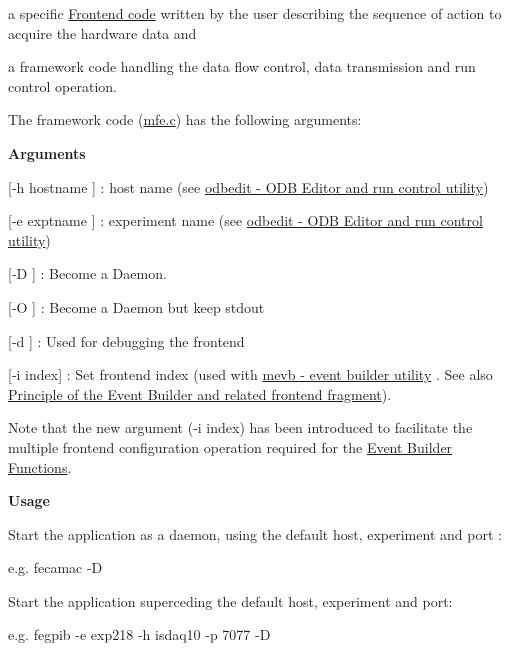 \begin{DoxyEnumerate}
\item a specific \hyperlink{Frontend_code}{Frontend code} written by the user describing the sequence of action to acquire the hardware data and
\item a framework code handling the data flow control, data transmission and run control operation.
\end{DoxyEnumerate}

The framework code (\hyperlink{mfe_8c}{mfe.c}) has the following arguments:
\begin{DoxyItemize}
\item {\bfseries  Arguments }
\begin{DoxyItemize}
\item \mbox{[}-\/h hostname \mbox{]} : host name (see \hyperlink{RC_odbedit_utility}{odbedit -\/ ODB Editor and run control utility})
\item \mbox{[}-\/e exptname \mbox{]} : experiment name (see \hyperlink{RC_odbedit_utility}{odbedit -\/ ODB Editor and run control utility})
\item \mbox{[}-\/D \mbox{]} : Become a Daemon.
\item \mbox{[}-\/O \mbox{]} : Become a Daemon but keep stdout
\item \mbox{[}-\/d \mbox{]} : Used for debugging the frontend
\item \mbox{[}-\/i index\mbox{]} : Set frontend index (used with \hyperlink{FE_Event_Builder_FE_mevb_utility}{mevb -\/ event builder utility} . See also \hyperlink{FE_Event_Builder_FE_principle_eb}{Principle of the Event Builder and related frontend fragment}).
\end{DoxyItemize}
\end{DoxyItemize}

Note that the new argument (-\/i index) has been introduced to facilitate the multiple frontend configuration operation required for the \hyperlink{FE_Event_Builder}{Event Builder Functions}.


\begin{DoxyItemize}
\item {\bfseries  Usage }
\end{DoxyItemize}

Start the application as a daemon, using the default host, experiment and port : 
\begin{DoxyCode}
e.g. fecamac -D
\end{DoxyCode}
 Start the application superceding the default host, experiment and port: 
\begin{DoxyCode}
e.g. fegpib -e exp218 -h isdaq10 -p 7077 -D
\end{DoxyCode}


